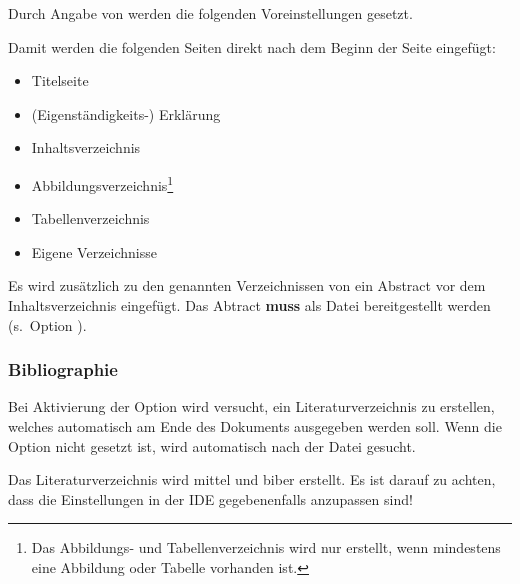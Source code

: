 \documentclass[babel=english,highlight=false]{skdoc}
\begin{document}
                Durch Angabe von  werden die folgenden Voreinstellungen gesetzt.
                \begin{description}
                    \item[]
                    \item[]
                \end{description}
                Damit werden die folgenden Seiten direkt nach dem Beginn der Seite eingefügt:
                \begin{itemize}
                    \item Titelseite
                    \item (Eigenständigkeits-) Erklärung
                    \item Inhaltsverzeichnis
                    \item Abbildungsverzeichnis\footnote{\label{fn:abb}Das Abbildungs- und Tabellenverzeichnis wird nur erstellt, wenn mindestens eine Abbildung oder Tabelle vorhanden ist.}
                    \item Tabellenverzeichnis
                    \item Eigene Verzeichnisse
                \end{itemize}

                Es wird zusätzlich zu den genannten Verzeichnissen von  ein Abstract vor dem Inhaltsverzeichnis eingefügt. Das Abtract \textbf{muss} als Datei bereitgestellt werden (s.~Option  ).

            \subsubsection{Bibliographie}
                Bei Aktivierung der Option wird versucht, ein Literaturverzeichnis zu erstellen, welches automatisch am Ende des Dokuments ausgegeben werden soll. Wenn die Option  nicht gesetzt ist, wird automatisch nach der Datei  gesucht.

                Das Literaturverzeichnis wird mittel  und biber erstellt. Es ist darauf zu achten, dass die Einstellungen in der IDE gegebenenfalls anzupassen sind!
\end{document}
